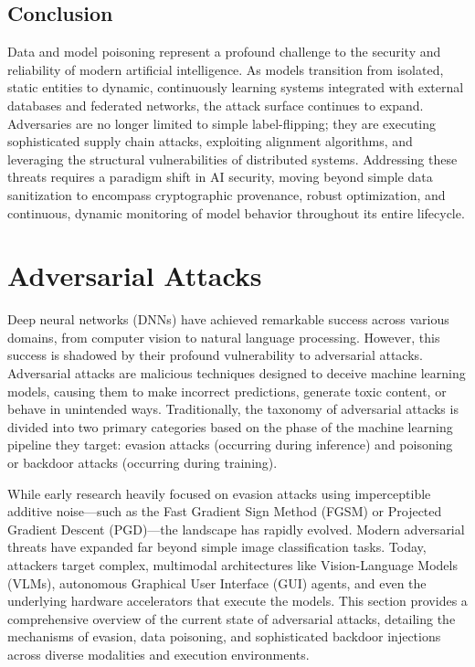 \documentclass[11pt,a4paper]{article}
\begin{document}
\subsection{Conclusion}

Data and model poisoning represent a profound challenge to the security and reliability of modern artificial intelligence. As models transition from isolated, static entities to dynamic, continuously learning systems integrated with external databases and federated networks, the attack surface continues to expand. Adversaries are no longer limited to simple label-flipping; they are executing sophisticated supply chain attacks, exploiting alignment algorithms, and leveraging the structural vulnerabilities of distributed systems. Addressing these threats requires a paradigm shift in AI security, moving beyond simple data sanitization to encompass cryptographic provenance, robust optimization, and continuous, dynamic monitoring of model behavior throughout its entire lifecycle.

\section{Adversarial Attacks}

Deep neural networks (DNNs) have achieved remarkable success across various domains, from computer vision to natural language processing. However, this success is shadowed by their profound vulnerability to adversarial attacks. Adversarial attacks are malicious techniques designed to deceive machine learning models, causing them to make incorrect predictions, generate toxic content, or behave in unintended ways. Traditionally, the taxonomy of adversarial attacks is divided into two primary categories based on the phase of the machine learning pipeline they target: evasion attacks (occurring during inference) and poisoning or backdoor attacks (occurring during training). 

While early research heavily focused on evasion attacks using imperceptible additive noise---such as the Fast Gradient Sign Method (FGSM) or Projected Gradient Descent (PGD)---the landscape has rapidly evolved. Modern adversarial threats have expanded far beyond simple image classification tasks. Today, attackers target complex, multimodal architectures like Vision-Language Models (VLMs), autonomous Graphical User Interface (GUI) agents, and even the underlying hardware accelerators that execute the models. This section provides a comprehensive overview of the current state of adversarial attacks, detailing the mechanisms of evasion, data poisoning, and sophisticated backdoor injections across diverse modalities and execution environments.
\end{document}
